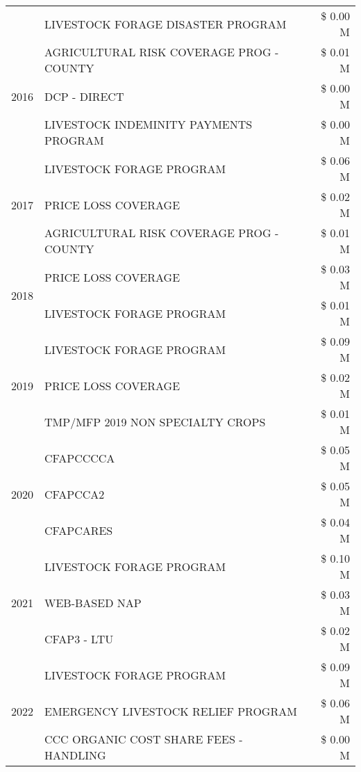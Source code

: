 \begin{tabular}{llr}
 & LIVESTOCK FORAGE DISASTER PROGRAM & \$ 0.00 M \\
\cline{1-3}
\multirow[t]{3}{*}{2016} & AGRICULTURAL RISK COVERAGE PROG - COUNTY & \$ 0.01 M \\
 & DCP - DIRECT & \$ 0.00 M \\
 & LIVESTOCK INDEMINITY PAYMENTS PROGRAM & \$ 0.00 M \\
\cline{1-3}
\multirow[t]{3}{*}{2017} & LIVESTOCK FORAGE PROGRAM & \$ 0.06 M \\
 & PRICE LOSS COVERAGE & \$ 0.02 M \\
 & AGRICULTURAL RISK COVERAGE PROG - COUNTY & \$ 0.01 M \\
\cline{1-3}
\multirow[t]{2}{*}{2018} & PRICE LOSS COVERAGE & \$ 0.03 M \\
 & LIVESTOCK FORAGE PROGRAM & \$ 0.01 M \\
\cline{1-3}
\multirow[t]{3}{*}{2019} & LIVESTOCK FORAGE PROGRAM & \$ 0.09 M \\
 & PRICE LOSS COVERAGE & \$ 0.02 M \\
 & TMP/MFP 2019 NON SPECIALTY CROPS & \$ 0.01 M \\
\cline{1-3}
\multirow[t]{3}{*}{2020} & CFAPCCCCA & \$ 0.05 M \\
 & CFAPCCA2 & \$ 0.05 M \\
 & CFAPCARES & \$ 0.04 M \\
\cline{1-3}
\multirow[t]{3}{*}{2021} & LIVESTOCK FORAGE PROGRAM & \$ 0.10 M \\
 & WEB-BASED NAP & \$ 0.03 M \\
 & CFAP3 - LTU & \$ 0.02 M \\
\cline{1-3}
\multirow[t]{3}{*}{2022} & LIVESTOCK FORAGE PROGRAM & \$ 0.09 M \\
 & EMERGENCY LIVESTOCK RELIEF PROGRAM & \$ 0.06 M \\
 & CCC ORGANIC COST SHARE FEES - HANDLING & \$ 0.00 M \\
\cline{1-3}
\bottomrule
\end{tabular}
